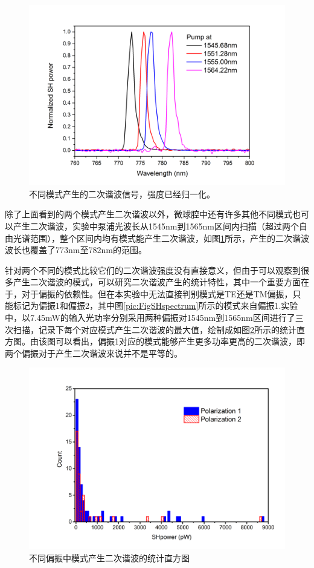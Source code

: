\documentclass[UTF8,a4paper,cs4size,hyperref]{ctexart}
\begin{document}
\begin{figure}
\centering
\includegraphics[width=14cm ]{FigSHexamples}
\caption{不同模式产生的二次谐波信号，强度已经归一化。}
\label{pic:FigSHexamples}
\end{figure}

除了上面看到的两个模式产生二次谐波以外，微球腔中还有许多其他不同模式也可以产生二次谐波，实验中泵浦光波长从1545nm到1565nm区间内扫描（超过两个自由光谱范围），整个区间内均有模式能产生二次谐波，如图\ref{pic:FigSHexamples}所示，产生的二次谐波波长也覆盖了773nm至782nm的范围。

针对两个不同的模式比较它们的二次谐波强度没有直接意义，但由于可以观察到很多产生二次谐波的模式，可以研究二次谐波产生的统计特性，其中一个重要方面在于，对于偏振的依赖性。但在本实验中无法直接判别模式是TE还是TM偏振，只能标记为偏振1和偏振2，其中图\ref{pic:FigSHspectrum}所示的模式来自偏振1.实验中，以7.45mW的输入光功率分别采用两种偏振对1545nm到1565nm区间进行了三次扫描，记录下每个对应模式产生二次谐波的最大值，绘制成如图\ref{pic:PolarizationHistogram}所示的统计直方图。由该图可以看出，偏振1对应的模式能够产生更多功率更高的二次谐波，即两个偏振对于产生二次谐波来说并不是平等的。

\begin{figure}
\centering
\includegraphics[width=14cm ]{PolarizationHistogram}
\caption{不同偏振中模式产生二次谐波的统计直方图}
\label{pic:PolarizationHistogram}
\end{figure}
\end{document}
